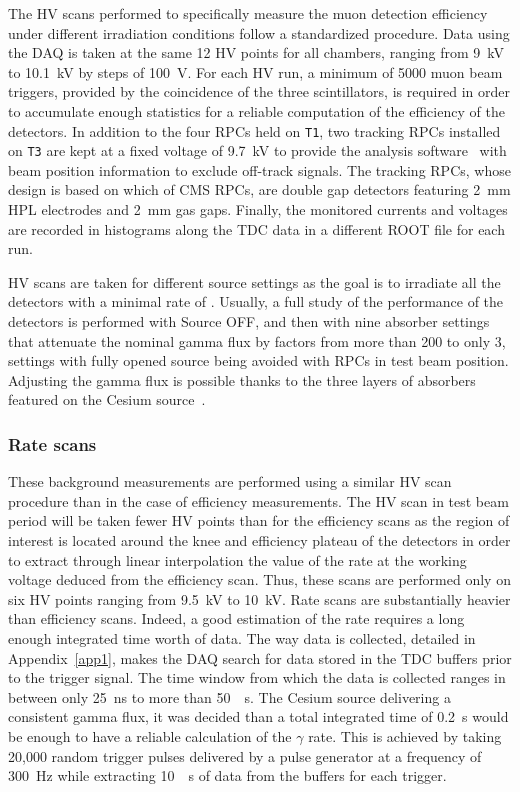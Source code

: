 	The HV scans performed to specifically measure the muon detection efficiency under different irradiation conditions follow a standardized procedure. Data using the DAQ is taken at the same 12 HV points for all chambers, ranging from \SI{9}{kV} to \SI{10.1}{kV} by steps of \SI{100}{V}. For each HV run, a minimum of 5000 muon beam triggers, provided by the coincidence of the three scintillators, is required in order to accumulate enough statistics for a reliable computation of the efficiency of the detectors. In addition to the four RPCs held on \texttt{T1}, two tracking RPCs installed on \texttt{T3} are kept at a fixed voltage of \SI{9,7}{kV} to provide the analysis software~\cite{GIFOffline} with beam position information to exclude off-track signals. The tracking RPCs, whose design is based on which of CMS RPCs, are double gap detectors featuring \SI{2}{mm} HPL electrodes and \SI{2}{mm} gas gaps. Finally, the monitored currents and voltages are recorded in histograms along the TDC data in a different ROOT file for each run.
	
	HV scans are taken for different source settings as the goal is to irradiate all the detectors with a minimal rate of . Usually, a full study of the performance of the detectors is performed with Source OFF, and then with nine absorber settings that attenuate the nominal gamma flux by factors from more than 200 to only 3, settings with fully opened source being avoided with RPCs in test beam position. Adjusting the gamma flux is possible thanks to the three layers of absorbers featured on the Cesium source~\cite{GIFFILTERS}.
	
		\subsubsection{Rate scans}
		\label{chapt5:sssec:ratescan}
		
	These background measurements are performed using a similar HV scan procedure than in the case of efficiency measurements. The HV scan in test beam period will be taken fewer HV points than for the efficiency scans as the region of interest is located around the knee and efficiency plateau of the detectors in order to extract through linear interpolation the value of the rate at the working voltage deduced from the efficiency scan. Thus, these scans are performed only on six HV points ranging from \SI{9.5}{kV} to \SI{10}{kV}. Rate scans are substantially heavier than efficiency scans. Indeed, a good estimation of the rate requires a long enough integrated time worth of data. The way data is collected, detailed in Appendix~\ref{app1}, makes the DAQ search for data stored in the TDC buffers prior to the trigger signal. The time window from which the data is collected ranges in between only \SI{25}{ns} to more than \SI{50}{\mu s}. The Cesium source delivering a consistent gamma flux, it was decided than a total integrated time of \SI{0.2}{s} would be enough to have a reliable calculation of the $\gamma$ rate. This is achieved by taking 20,000 random trigger pulses delivered by a pulse generator at a frequency of \SI{300}{Hz} while extracting \SI{10}{\mu s} of data from the buffers for each trigger.
		
